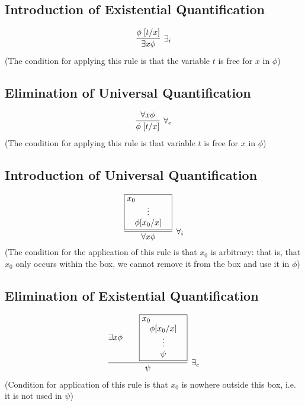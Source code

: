 \documentclass{article}
\newcommand{\rulename}[1]{#1}
\newcommand{\hint}[1]{#1}
\newcommand{\myex}[2]{\exists #1 #2}
\newcommand{\myall}[2]{\forall #1 #2}
\begin{document}
\subsection*{Introduction of Existential Quantification}
    \begin{align*}
      \infer[\rulename{\exists_i}]
      {\myex{x}{\phi}}
      {\phi\;[t/x]}
    \end{align*}
    (The condition for applying this rule is that the variable $t$ is free for $x$ in $\phi$) %

\subsection*{Elimination of Universal Quantification}
    \begin{align*}
      \infer[\rulename{\forall_e}]
      {\phi\;[t/x]}
      {\myall{x}{\phi}}
    \end{align*}
    (The condition for applying this rule is that variable $t$ is free for $x$ in $\phi$)
\subsection*{Introduction of Universal Quantification}
    \begin{equation*}
      \infer[\rulename{\forall_i}]
      {\forall x \phi}
      {
        \framebox{\parbox{1.8cm}{\hint{$x_0$}
        \centerline{\vdots}
        \centerline{$\phi[x_0/x]$}}}
      }
    \end{equation*}
    (The condition for the application of this rule is that $x_0$ is arbitrary: that is, that $x_0$ only occurs within the box, we cannot remove it from the box and use it in $\phi$)
    
\subsection*{Elimination of Existential Quantification}
    \begin{align*}
      \infer[\rulename{\exists_e}]
      {\psi}
      {
        \myex{x}{\phi} &&
        \framebox{\parbox{1.8cm}{\hint{$x_0$}\\\centerline{$\phi[x_0/x]$}\\\centerline{$\vdots$}\\\centerline{$\psi$}}}
      }
    \end{align*}
    (Condition for application of this rule is that $x_0$ is nowhere outside this box, i.e. it is not used in $\psi$)
\end{document}
